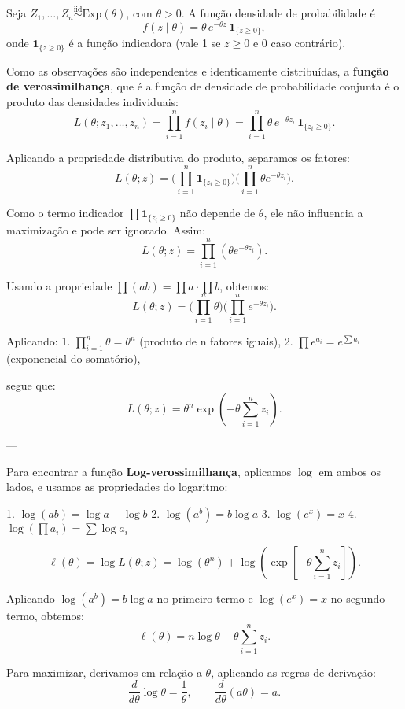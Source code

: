 Seja $Z_1,\ldots,Z_n \stackrel{\text{iid}}{\sim}\mathrm{Exp}(\theta)$, com $\theta>0$.
A função densidade de probabilidade é
\[
f(z\mid\theta)=\theta\,e^{-\theta z}\,\mathbf 1_{\{z\ge 0\}},
\]
onde $\mathbf 1_{\{z\ge 0\}}$ é a função indicadora (vale 1 se $z\ge 0$ e 0 caso contrário).

Como as observações são independentes e identicamente distribuídas,
a \textbf{função de verossimilhança}, que é a função de densidade de probabilidade conjunta é o produto das densidades individuais:
\[
L(\theta;z_1,\ldots,z_n)
=\prod_{i=1}^n f(z_i\mid\theta)
=\prod_{i=1}^n \theta\,e^{-\theta z_i}\,\mathbf 1_{\{z_i\ge 0\}}.
\]

Aplicando a propriedade distributiva do produto, separamos os fatores:
\[
L(\theta;z)
=\Big(\prod_{i=1}^n \mathbf 1_{\{z_i\ge 0\}}\Big)
\Big(\prod_{i=1}^n \theta e^{-\theta z_i}\Big).
\]

Como o termo indicador $\prod \mathbf 1_{\{z_i\ge 0\}}$ não depende de $\theta$,
ele não influencia a maximização e pode ser ignorado. Assim:
\[
L(\theta;z)
=\prod_{i=1}^n (\theta e^{-\theta z_i}).
\]

Usando a propriedade $\prod(ab)=\prod a \cdot \prod b$, obtemos:
\[
L(\theta;z)
=\Big(\prod_{i=1}^n \theta\Big)
\Big(\prod_{i=1}^n e^{-\theta z_i}\Big).
\]

Aplicando:
1. $\prod_{i=1}^n \theta = \theta^n$ (produto de n fatores iguais),  
2. $\prod e^{a_i} = e^{\sum a_i}$ (exponencial do somatório),  

segue que:
\[
\boxed{
L(\theta;z)
=\theta^n \exp\!\left(-\theta \sum_{i=1}^n z_i\right).}
\]

---

Para encontrar a função \textbf{Log-verossimilhança}, aplicamos $\log$ em ambos os lados, e usamos as propriedades do logaritmo:

1. $\log(ab)=\log a+\log b$  
2. $\log(a^b)=b\log a$  
3. $\log(e^x)=x$  
4. $\log(\prod a_i)=\sum \log a_i$

\[
\ell(\theta)=\log L(\theta;z)
=\log(\theta^n)+\log\!\left(\exp\!\left[-\theta\sum_{i=1}^n z_i\right]\right).
\]

Aplicando $\log(a^b)=b\log a$ no primeiro termo
e $\log(e^x)=x$ no segundo termo, obtemos:
\[
\ell(\theta)=n\log\theta-\theta\sum_{i=1}^n z_i.
\]

Para maximizar, derivamos em relação a $\theta$, aplicando as regras de derivação:
\[
\frac{d}{d\theta}\log\theta=\frac{1}{\theta}, \qquad
\frac{d}{d\theta}(a\theta)=a.
\]


